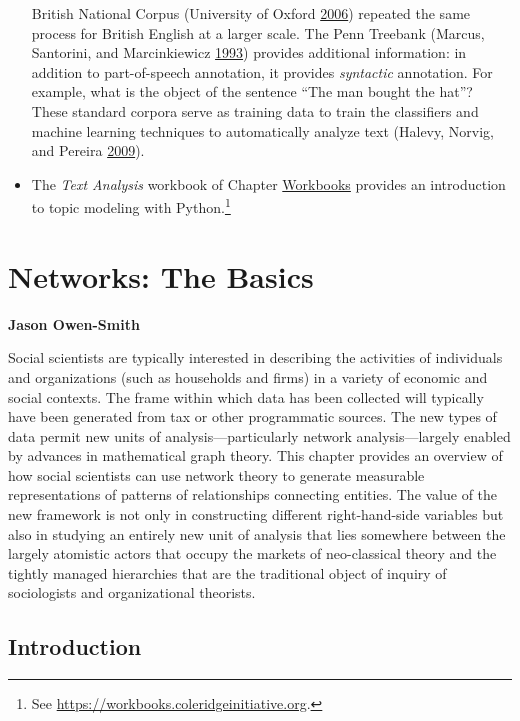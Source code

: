 \documentclass[]{krantz}
\begin{document}
\begin{itemize}
  British National Corpus (University of Oxford
  \protect\hyperlink{ref-bnc}{2006}) repeated the same process for
  British English at a larger scale. The Penn Treebank (Marcus,
  Santorini, and Marcinkiewicz \protect\hyperlink{ref-marcus-93}{1993})
  provides additional information: in addition to part-of-speech
  annotation, it provides \emph{syntactic} annotation. For example, what
  is the object of the sentence ``The man bought the hat''? These
  standard corpora serve as training data to train the classifiers and
  machine learning techniques to automatically analyze text (Halevy,
  Norvig, and Pereira \protect\hyperlink{ref-halevy-09}{2009}).
\item
  The \emph{Text Analysis} workbook of Chapter
  \protect\hyperlink{chap:workbooks}{Workbooks} provides an introduction
  to topic modeling with Python.\footnote{See
    \url{https://workbooks.coleridgeinitiative.org}.}
\end{itemize}

\hypertarget{chap:networks}{\chapter{Networks: The
Basics}\label{chap:networks}}

\textbf{Jason Owen-Smith}

Social scientists are typically interested in describing the activities
of individuals and organizations (such as households and firms) in a
variety of economic and social contexts. The frame within which data has
been collected will typically have been generated from tax or other
programmatic sources. The new types of data permit new units of
analysis---particularly network analysis---largely enabled by advances
in mathematical graph theory. This chapter provides an overview of how
social scientists can use network theory to generate measurable
representations of patterns of relationships connecting entities. The
value of the new framework is not only in constructing different
right-hand-side variables but also in studying an entirely new unit of
analysis that lies somewhere between the largely atomistic actors that
occupy the markets of neo-classical theory and the tightly managed
hierarchies that are the traditional object of inquiry of sociologists
and organizational theorists.

\section{Introduction}\label{introduction-3}
\end{document}
